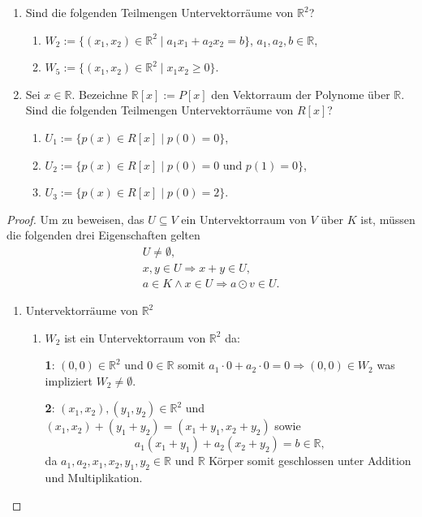 \documentclass{../problemset}
\begin{document}
\begin{problem}
\begin{enumerate}
	\item Sind die folgenden Teilmengen Untervektorräume von $\mathbb{R}^2$?
	      \begin{enumerate}[label=\alph*)]
		      \item $W_2 := \{(x_1, x_2) \in \mathbb{R}^2 \mid a_1x_1 + a_2x_2 = b\}$, $a_1, a_2, b \in \mathbb{R}$,
		      \item $W_5 := \{(x_1, x_2) \in \mathbb{R}^2 \mid x_1x_2 \geq 0\}$.
	      \end{enumerate}
	\item Sei $x \in \mathbb{R}$. Bezeichne $\mathbb{R}[x] := P[x]$ den Vektorraum der Polynome über $\mathbb{R}$.
	      Sind die folgenden Teilmengen Untervektorräume von $R[x]$?
	      \begin{enumerate}[label=\alph*)]
		      \item $U_1 := \{p(x) \in R[x] \mid p(0) = 0\}$,
		      \item $U_2 := \{p(x) \in R[x] \mid p(0) = 0 \text{ und } p(1) = 0\}$,
		      \item $U_3 := \{p(x) \in R[x] \mid p(0) = 2\}$.
	      \end{enumerate}
\end{enumerate}
\begin{proof}
	Um zu beweisen, das $U \subseteq V$ ein Untervektorraum von $V$ über $K$ ist, müssen die folgenden drei Eigenschaften gelten \begin{align}
		U \neq \emptyset,                       \\
		x, y \in U \Longrightarrow x + y \in U, \\
		a \in K \land x \in U \Longrightarrow a \odot v \in U.
	\end{align}

	\begin{enumerate}
		\item Untervektorräume von $\mathbb{R}^2$

		      \begin{enumerate}[label=\alph*)]
			      \item $W_2$ ist ein Untervektorraum von $\mathbb{R}^2$ da:

			            \textbf{1}: $(0, 0) \in \mathbb{R}^2$ und $0 \in \mathbb{R}$ somit $a_1 \cdot 0 + a_2 \cdot 0 = 0 \Longrightarrow (0, 0) \in W_2$ was impliziert $W_2 \neq \emptyset$. \checkmark

			            \textbf{2}: $(x_1, x_2), (y_1, y_2) \in \mathbb{R}^2$ und $(x_1, x_2) + (y_1+y_2) = (x_1 + y_1, x_2 + y_2)$ sowie \[
				            a_1(x_1+y_1) + a_2(x_2+y_2) = b \in \mathbb{R},
			            \] da $a_1,a_2,x_1,x_2,y_1,y_2 \in \mathbb{R}$ und $\mathbb{R}$ Körper somit geschlossen unter Addition und Multiplikation.


\end{enumerate}
\end{enumerate}
\end{proof}
\end{problem}
\end{document}

